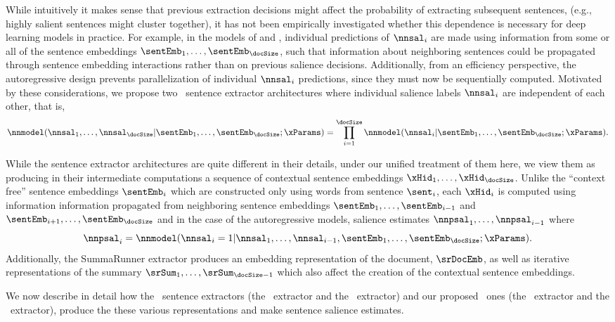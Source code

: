 While intuitively it makes sense that previous extraction decisions might
affect the probability of extracting subsequent sentences, (e.g., highly
salient sentences might cluster together), it has not been empirically
investigated whether this dependence is necessary for deep learning models in
practice. For example, in the models of \citet{cheng2016neural} and
\citet{nallapati2017summarunner}, individual predictions of $\nnsal_i$ are made
using information from some or all of the sentence embeddings $\sentEmb_1,
\ldots, \sentEmb_\docSize$, such that information about neighboring sentences
could be propagated through sentence embedding interactions rather than on
previous salience decisions.  Additionally, from an efficiency perspective, the
autoregressive design prevents parallelization of individual $\nnsal_i$
predictions, since they must now be sequentially computed.  Motivated by these
considerations, we propose two \nonautoregressive~sentence extractor
architectures where individual salience labels $\nnsal_i$ are independent of
each other, that is, 
\[
    \nnmodel(\nnsal_1,\ldots,\nnsal_\docSize|\sentEmb_1,\ldots,\sentEmb_\docSize;\xParams) = \prod_{i=1}^\docSize 
\nnmodel(\nnsal_i|\sentEmb_1,\ldots,\sentEmb_\docSize;\xParams).
\]

While the sentence extractor architectures are quite different in their
details, under our unified treatment of them here, we view them as producing in
their intermediate computations a sequence of contextual sentence embeddings
$\xHid_1,\ldots,\xHid_\docSize$.  Unlike the ``context free'' sentence
embeddings $\sentEmb_i$ which are constructed only using words from sentence
$\sent_i$,  each $\xHid_i$ is computed using information information propagated
from neighboring sentence embeddings $\sentEmb_1, \ldots, \sentEmb_{i-1}$ and
$\sentEmb_{i+1}, \ldots, \sentEmb_\docSize$ and in the case of the
autoregressive models, salience estimates $\nnpsal_1,\ldots,\nnpsal_{i-1}$
where 
\[
    \nnpsal_i = \nnmodel(\nnsal_i=1|\nnsal_1,\ldots,\nnsal_{i-1},\sentEmb_1, \ldots, \sentEmb_\docSize;\xParams).
\]
Additionally, the SummaRunner extractor produces an embedding representation of
the document, $\srDocEmb$, as well as iterative representations of the summary
$\srSum_1,\ldots, \srSum_{\docSize-1}$ which also affect the creation of the
contextual sentence embeddings.

We now describe in detail how  the \autoregressive~sentence extractors (the
\clext~extractor and  the \srext~extractor) and our proposed
\nonautoregressive~ones (the \rnnext~extractor and the \stsext~extractor),
produce the these various representations and make sentence salience estimates. 

